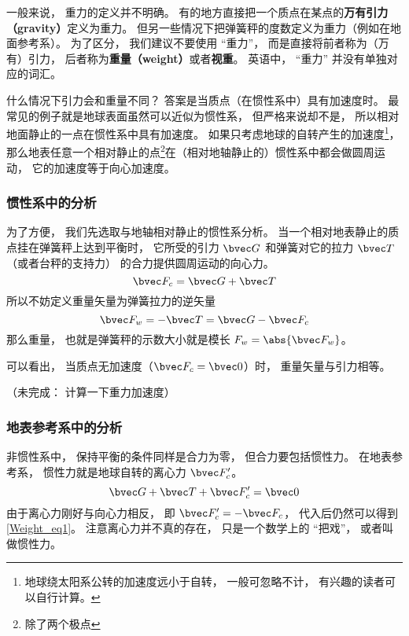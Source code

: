 

一般来说， 重力的定义并不明确。 有的地方直接把一个质点在某点的\textbf{万有引力（gravity）}定义为重力。 但另一些情况下把弹簧秤的度数定义为重力（例如在地面参考系）。 为了区分， 我们建议不要使用 “重力”， 而是直接将前者称为（万有）引力， 后者称为\textbf{重量（weight）}或者\textbf{视重}。 英语中， “重力” 并没有单独对应的词汇。

什么情况下引力会和重量不同？ 答案是当质点（在惯性系中）具有加速度时。 最常见的例子就是地球表面虽然可以近似为惯性系， 但严格来说却不是， 所以相对地面静止的一点在惯性系中具有加速度。 如果只考虑地球的自转产生的加速度\footnote{地球绕太阳系公转的加速度远小于自转， 一般可忽略不计， 有兴趣的读者可以自行计算。}， 那么地表任意一个相对静止的点\footnote{除了两个极点}在（相对地轴静止的）惯性系中都会做圆周运动， 它的加速度等于向心加速度。

\subsubsection{惯性系中的分析}
为了方便， 我们先选取与地轴相对静止的惯性系分析。 当一个相对地表静止的质点挂在弹簧秤上达到平衡时， 它所受的引力 $\bvec G$ 和弹簧对它的拉力 $\bvec T$（或者台秤的支持力） 的合力提供圆周运动的向心力。
\begin{equation}\label{Weight_eq1}
\bvec F_c = \bvec G + \bvec T
\end{equation}
所以不妨定义重量矢量为弹簧拉力的逆矢量
\begin{equation}
\bvec F_w = -\bvec T = \bvec G - \bvec F_c
\end{equation}
那么重量， 也就是弹簧秤的示数大小就是模长 $F_w = \abs{\bvec F_w}$。

可以看出， 当质点无加速度（$\bvec F_c = \bvec 0$）时， 重量矢量与引力相等。

（未完成： 计算一下重力加速度）

\subsubsection{地表参考系中的分析}
非惯性系中， 保持平衡的条件同样是合力为零， 但合力要包括惯性力。 在地表参考系， 惯性力就是地球自转的离心力 $\bvec F'_c$。
\begin{equation}
\bvec G + \bvec T + \bvec F'_c = \bvec 0
\end{equation}
由于离心力刚好与向心力相反， 即 $\bvec F'_c = -\bvec F_c$， 代入后仍然可以得到\autoref{Weight_eq1}。 注意离心力并不真的存在， 只是一个数学上的 “把戏”， 或者叫做惯性力。
